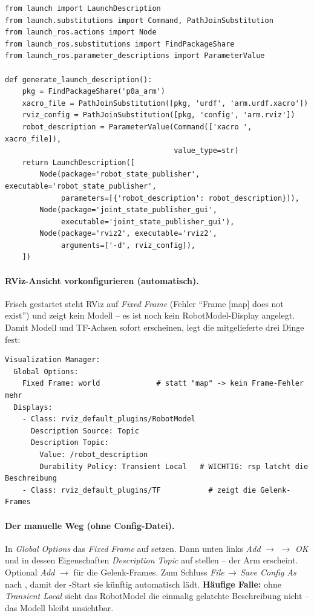 \begin{lstlisting}[style=py,caption={\code{launch/display.launch.py}}]
from launch import LaunchDescription
from launch.substitutions import Command, PathJoinSubstitution
from launch_ros.actions import Node
from launch_ros.substitutions import FindPackageShare
from launch_ros.parameter_descriptions import ParameterValue

def generate_launch_description():
    pkg = FindPackageShare('p0a_arm')
    xacro_file = PathJoinSubstitution([pkg, 'urdf', 'arm.urdf.xacro'])
    rviz_config = PathJoinSubstitution([pkg, 'config', 'arm.rviz'])
    robot_description = ParameterValue(Command(['xacro ', xacro_file]),
                                       value_type=str)
    return LaunchDescription([
        Node(package='robot_state_publisher', executable='robot_state_publisher',
             parameters=[{'robot_description': robot_description}]),
        Node(package='joint_state_publisher_gui',
             executable='joint_state_publisher_gui'),
        Node(package='rviz2', executable='rviz2',
             arguments=['-d', rviz_config]),
    ])
\end{lstlisting}

\paragraph{RViz-Ansicht vorkonfigurieren (automatisch).} Frisch gestartet steht
RViz auf \emph{Fixed Frame}  (Fehler ``Frame [map] does not exist'')
und zeigt kein Modell -- es ist noch kein RobotModel-Display angelegt. Damit
Modell und TF-Achsen sofort erscheinen, legt die mitgelieferte
 drei Dinge fest:
\begin{lstlisting}[style=yaml,caption={\code{config/arm.rviz} -- die entscheidenden Einträge}]
Visualization Manager:
  Global Options:
    Fixed Frame: world             # statt "map" -> kein Frame-Fehler mehr
  Displays:
    - Class: rviz_default_plugins/RobotModel
      Description Source: Topic
      Description Topic:
        Value: /robot_description
        Durability Policy: Transient Local   # WICHTIG: rsp latcht die Beschreibung
    - Class: rviz_default_plugins/TF           # zeigt die Gelenk-Frames
\end{lstlisting}

\paragraph{Der manuelle Weg (ohne Config-Datei).} In \emph{Global Options} das
\emph{Fixed Frame} auf  setzen. Dann unten links \emph{Add}
$\rightarrow$  $\rightarrow$ \emph{OK} und in dessen
Eigenschaften \emph{Description Topic} auf  stellen --
der Arm erscheint. Optional \emph{Add} $\rightarrow$  für die
Gelenk-Frames. Zum Schluss \emph{File\,$\rightarrow$\,Save Config As} nach
, damit der -Start sie künftig automatisch lädt.
\textbf{Häufige Falle:} ohne \emph{Transient Local} sieht das RobotModel die
einmalig gelatchte Beschreibung nicht -- das Modell bleibt unsichtbar.

